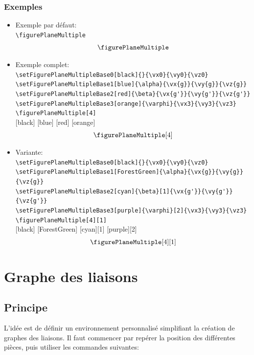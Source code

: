 \documentclass[11pt]{ltxdockit}[2010/09/26]
\begin{document}
\subsubsection{Exemples}
\begin{itemize}
\item Exemple par défaut: \\ \verb!\figurePlaneMultiple!
\[ \figurePlaneMultiple \]
\item Exemple complet: \\ 
\verb!\setFigurePlaneMultipleBase0[black]{}{\vx0}{\vy0}{\vz0}!\\
\verb!\setFigurePlaneMultipleBase1[blue]{\alpha}{\vx{g}}{\vy{g}}{\vz{g}}!\\
\verb!\setFigurePlaneMultipleBase2[red]{\beta}{\vx{g'}}{\vy{g'}}{\vz{g'}}!\\
\verb!\setFigurePlaneMultipleBase3[orange]{\varphi}{\vx3}{\vy3}{\vz3}!\\
\verb!\figurePlaneMultiple[4]!\\
[black]{}{}{}{}
[blue]{\alpha}{}{}{}
[red]{\beta}{}{}{}
[orange]{\varphi}{}{}{}
\[ \figurePlaneMultiple[4] \]
\item Variante: \\ 
\verb!\setFigurePlaneMultipleBase0[black]{}{\vx0}{\vy0}{\vz0}!\\
\verb!\setFigurePlaneMultipleBase1[ForestGreen]{\alpha}{\vx{g}}{\vy{g}}{\vz{g}}!\\
\verb!\setFigurePlaneMultipleBase2[cyan]{\beta}[1]{\vx{g'}}{\vy{g'}}{\vz{g'}}!\\
\verb!\setFigurePlaneMultipleBase3[purple]{\varphi}[2]{\vx3}{\vy3}{\vz3}!\\
\verb!\figurePlaneMultiple[4][1]!\\
[black]{}{}{}{}
[ForestGreen]{\alpha}{}{}{}
[cyan]{\beta}[1]{}{}{}
[purple]{\varphi}[2]{}{}{}
\[ \figurePlaneMultiple[4][1] \]
\end{itemize}

\section{Graphe des liaisons}
\subsection{Principe}
L'idée est de définir un environnement personnalisé simplifiant la création de graphes des liaisons. Il faut commencer par repérer la position des différentes pièces, puis utiliser les commandes suivantes:
\end{document}
